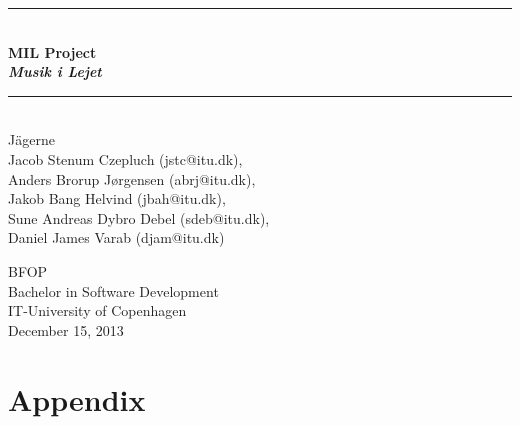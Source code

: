 \documentclass[a4paper,11pt]{article}
\begin{document}
\begin{titlepage}
\centering \parindent=0pt
\newcommand{\HRule}{\rule{\textwidth}{1mm}}
 \HRule\\[1cm]\Huge\bfseries
MIL Project\\\emph{Musik i Lejet}\\[0.7cm]
\HRule\\[4cm]  \large  Jägerne
\\Jacob Stenum Czepluch (jstc@itu.dk), \\
Anders Brorup Jørgensen (abrj@itu.dk), \\
Jakob Bang Helvind (jbah@itu.dk), \\
Sune Andreas Dybro Debel (sdeb@itu.dk), \\
Daniel James Varab (djam@itu.dk) \\

 \normalsize %
\thispagestyle{empty}
\begin{flushleft}
BFOP \\
Bachelor in Software Development\\


IT-University of Copenhagen\\
December 15, 2013 \end{flushleft}
\end{titlepage}
\tableofcontents
\pagebreak
\pagebreak
{}
\setcounter{page}{1}





\appendix
\part{Appendix}


















%
\end{document}
